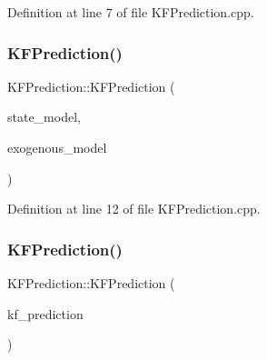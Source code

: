 Definition at line 7 of file K\+F\+Prediction.\+cpp.

\mbox{\label{classbfl_1_1KFPrediction_a2fe62141dd9b689ad65b682bfa7f1482}} 
\subsubsection{\texorpdfstring{K\+F\+Prediction()}{KFPrediction()}\hspace{0.1cm}{\footnotesize\ttfamily [2/3]}}
{\footnotesize\ttfamily K\+F\+Prediction\+::\+K\+F\+Prediction (\begin{DoxyParamCaption}\item[{std\+::unique\+\_\+ptr$<$ \mbox{\hyperlink{classbfl_1_1LinearStateModel}{Linear\+State\+Model}} $>$}]{state\+\_\+model,  }\item[{std\+::unique\+\_\+ptr$<$ \mbox{\hyperlink{classbfl_1_1ExogenousModel}{Exogenous\+Model}} $>$}]{exogenous\+\_\+model }\end{DoxyParamCaption})\hspace{0.3cm}{\ttfamily [noexcept]}}



Definition at line 12 of file K\+F\+Prediction.\+cpp.

\mbox{\label{classbfl_1_1KFPrediction_a83a41dc6651592cdaccbd3fae8f3e0de}} 
\subsubsection{\texorpdfstring{K\+F\+Prediction()}{KFPrediction()}\hspace{0.1cm}{\footnotesize\ttfamily [3/3]}}
{\footnotesize\ttfamily K\+F\+Prediction\+::\+K\+F\+Prediction (\begin{DoxyParamCaption}\item[{\mbox{\hyperlink{classbfl_1_1KFPrediction}{K\+F\+Prediction}} \&\&}]{kf\+\_\+prediction }\end{DoxyParamCaption})\hspace{0.3cm}{\ttfamily [noexcept]}}



